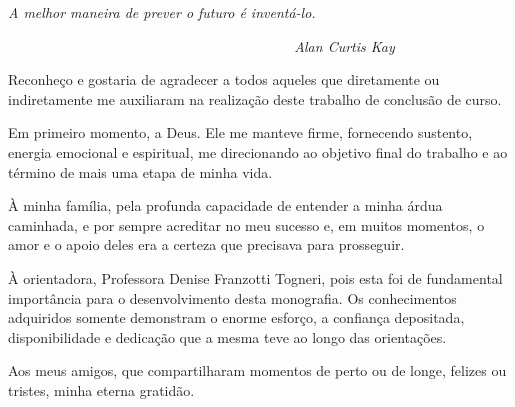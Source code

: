 \documentclass[a4paper]{article}
\begin{document}
\bigskip


\bigskip


\bigskip


\bigskip


\bigskip


\bigskip


\bigskip


\bigskip


\bigskip


\bigskip


\bigskip


\bigskip


\bigskip


\bigskip


\bigskip

{
\textsf{\textit{A melhor maneira de prever o futuro \'e invent\'a-lo.}}}

{\raggedleft{}
\textsf{\textit{\ \ \ \ \ \ \ \ \ \ \ \ \ \ \ \ \ \ \ \ \ \ \ \ \ \ \ \ \ \ \ \ \ \ \ \ \ \ \ \ Alan Curtis Kay}}
\par}



\bigskip

\foreignlanguage{portuges}{\textsf{Reconhe\c{c}o e gostaria de agradecer a todos aqueles que diretamente ou
indiretamente me auxiliaram na realiza\c{c}\~ao deste trabalho de conclus\~ao de curso.}}

{
\textsf{Em primeiro momento, a Deus. Ele me manteve firme, fornecendo sustento, energia emocional e espiritual, me
direcionando ao objetivo final do trabalho e ao t\'ermino de mais uma etapa de minha vida.}}

{
\textsf{\`A minha fam\'ilia, pela profunda capacidade de entender a minha \'ardua caminhada, e por sempre acreditar no
meu sucesso e, em muitos momentos, o amor e o apoio deles era a certeza que precisava para prosseguir.}}

{
\textsf{\`A orientadora, Professora Denise Franzotti Togneri, pois esta foi de fundamental import\^ancia para o
desenvolvimento desta monografia. Os conhecimentos adquiridos somente demonstram o enorme esfor\c{c}o, a confian\c{c}a
depositada, disponibilidade e dedica\c{c}\~ao que a mesma teve ao longo das orienta\c{c}\~oes.}}

{
\textsf{Aos meus amigos, que compartilharam momentos de perto ou de longe, felizes ou tristes, minha eterna
gratid\~ao.}}
\end{document}
